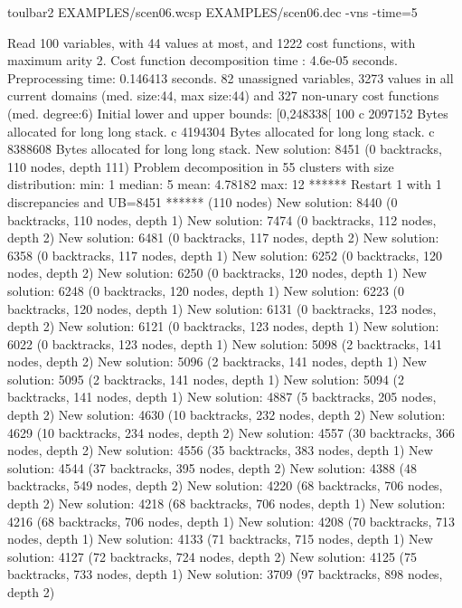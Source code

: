 \begin{enumerate}
\begin{DoxyCode}
	toulbar2 EXAMPLES/scen06.wcsp EXAMPLES/scen06.dec -vns -time=5
\end{DoxyCode}
{\scriptsize
\begin{DoxyCode}
Read 100 variables, with 44 values at most, and 1222 cost functions, with maximum arity 2.
Cost function decomposition time : 4.6e-05 seconds.
Preprocessing time: 0.146413 seconds.
82 unassigned variables, 3273 values in all current domains (med. size:44, max size:44) and 327 non-unary cost functions (med. degree:6)
Initial lower and upper bounds: [0,248338[ 100%
c 2097152 Bytes allocated for long long stack.
c 4194304 Bytes allocated for long long stack.
c 8388608 Bytes allocated for long long stack.
New solution: 8451 (0 backtracks, 110 nodes, depth 111)
Problem decomposition in 55 clusters with size distribution: min: 1 median: 5 mean: 4.78182 max: 12
****** Restart 1 with 1 discrepancies and UB=8451 ****** (110 nodes)
New solution: 8440 (0 backtracks, 110 nodes, depth 1)
New solution: 7474 (0 backtracks, 112 nodes, depth 2)
New solution: 6481 (0 backtracks, 117 nodes, depth 2)
New solution: 6358 (0 backtracks, 117 nodes, depth 1)
New solution: 6252 (0 backtracks, 120 nodes, depth 2)
New solution: 6250 (0 backtracks, 120 nodes, depth 1)
New solution: 6248 (0 backtracks, 120 nodes, depth 1)
New solution: 6223 (0 backtracks, 120 nodes, depth 1)
New solution: 6131 (0 backtracks, 123 nodes, depth 2)
New solution: 6121 (0 backtracks, 123 nodes, depth 1)
New solution: 6022 (0 backtracks, 123 nodes, depth 1)
New solution: 5098 (2 backtracks, 141 nodes, depth 2)
New solution: 5096 (2 backtracks, 141 nodes, depth 1)
New solution: 5095 (2 backtracks, 141 nodes, depth 1)
New solution: 5094 (2 backtracks, 141 nodes, depth 1)
New solution: 4887 (5 backtracks, 205 nodes, depth 2)
New solution: 4630 (10 backtracks, 232 nodes, depth 2)
New solution: 4629 (10 backtracks, 234 nodes, depth 2)
New solution: 4557 (30 backtracks, 366 nodes, depth 2)
New solution: 4556 (35 backtracks, 383 nodes, depth 1)
New solution: 4544 (37 backtracks, 395 nodes, depth 2)
New solution: 4388 (48 backtracks, 549 nodes, depth 2)
New solution: 4220 (68 backtracks, 706 nodes, depth 2)
New solution: 4218 (68 backtracks, 706 nodes, depth 1)
New solution: 4216 (68 backtracks, 706 nodes, depth 1)
New solution: 4208 (70 backtracks, 713 nodes, depth 1)
New solution: 4133 (71 backtracks, 715 nodes, depth 1)
New solution: 4127 (72 backtracks, 724 nodes, depth 2)
New solution: 4125 (75 backtracks, 733 nodes, depth 1)
New solution: 3709 (97 backtracks, 898 nodes, depth 2)

\end{DoxyCode}}
\end{enumerate}
